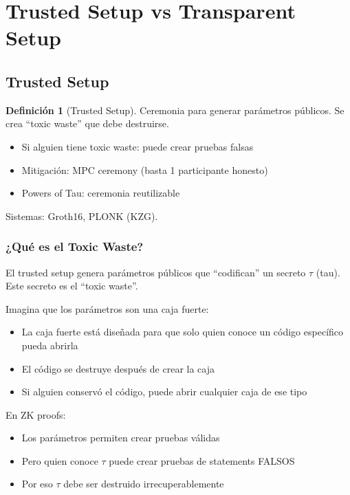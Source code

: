 \documentclass[11pt,a4paper,twoside,openright]{book}
\theoremstyle{definition}
\newtheorem{definition}{Definición}[chapter]
\theoremstyle{plain}
\theoremstyle{remark}
\begin{document}

\section{Trusted Setup vs Transparent Setup}

\subsection{Trusted Setup}

\begin{definition}[Trusted Setup]
Ceremonia para generar parámetros públicos. Se crea ``toxic waste'' que debe destruirse.
\end{definition}

\begin{itemize}
    \item Si alguien tiene toxic waste: puede crear pruebas falsas
    \item Mitigación: MPC ceremony (basta 1 participante honesto)
    \item Powers of Tau: ceremonia reutilizable
\end{itemize}

Sistemas: Groth16, PLONK (KZG).

\subsubsection{¿Qué es el Toxic Waste?}

\begin{intuicion}
El trusted setup genera parámetros públicos que ``codifican'' un secreto $\tau$ (tau). Este secreto es el ``toxic waste''.

Imagina que los parámetros son una caja fuerte:
\begin{itemize}
    \item La caja fuerte está diseñada para que solo quien conoce un código específico pueda abrirla
    \item El código se destruye después de crear la caja
    \item Si alguien conservó el código, puede abrir cualquier caja de ese tipo
\end{itemize}

En ZK proofs:
\begin{itemize}
    \item Los parámetros permiten crear pruebas válidas
    \item Pero quien conoce $\tau$ puede crear pruebas de statements FALSOS
    \item Por eso $\tau$ debe ser destruido irrecuperablemente
\end{itemize}
\end{intuicion}
\end{document}
